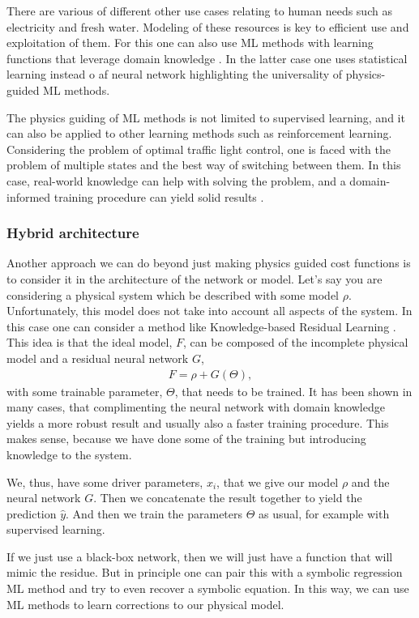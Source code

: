 \documentclass[12pt,a4paper]{article} %
\numberwithin{equation}{section}
\begin{document}
			There are various of different other use cases relating to human needs such as electricity and fresh water. Modeling of these resources is key to efficient use and exploitation of them. For this one can also use ML methods with learning functions that leverage domain knowledge \cite{xiong:2019, xu:2015, daw:2019}. In the latter case one uses statistical learning instead o af neural network highlighting the universality of physics-guided ML methods. 
			
			The physics guiding of ML methods is not limited to supervised learning, and it can also be applied to other learning methods such as reinforcement learning. Considering the problem of optimal traffic light control, one is faced with the problem of multiple states and the best way of switching between them. In this case, real-world knowledge can help with solving the problem, and a domain-informed training procedure can yield solid results \cite{xiong:2019}. 
			
		\subsubsection{Hybrid architecture}
			Another approach we can do beyond just making physics guided cost functions is to consider it in the architecture of the network or model. Let's say you are considering a physical system which be described with some model $\rho$. Unfortunately, this model does not take into account all aspects of the system. In this case one can consider a method like Knowledge-based Residual Learning \cite{zheng:2021}. This idea is that the ideal model, $F$, can be composed of the incomplete physical model and a residual neural network $G$,
			\begin{gather}
				F = \rho + G(\Theta),
			\end{gather}
			with some trainable parameter, $\Theta$, that needs to be trained. It has been shown in many cases, that complimenting the neural network with domain knowledge yields a more robust result and usually also a faster training procedure. This makes sense, because we have done some of the training but introducing knowledge to the system.
			
			We, thus, have some driver parameters, $x_i$, that we give our model $\rho$ and the neural network $G$. Then we concatenate the result together to yield the prediction $\hat{y}$. And then we train the parameters $\Theta$ as usual, for example with supervised learning.
			
			If we just use a black-box network, then we will just have a function that will mimic the residue. But in principle one can pair this with a symbolic regression ML method and try to even recover a symbolic equation. In this way, we can use ML methods to learn corrections to our physical model.
		
\end{document}

